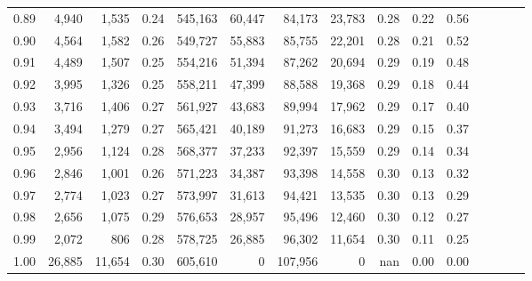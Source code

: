 \begin{tabular}{rrrcrrrrrrrrrrr}
0.89 &   4,940 &   1,535 &                                       0.24 &  545,163 &   60,447 &   84,173 &   23,783 &  0.28 &  0.22 &                         0.56 \\
0.90 &   4,564 &   1,582 &                                       0.26 &  549,727 &   55,883 &   85,755 &   22,201 &  0.28 &  0.21 &                         0.52 \\
0.91 &   4,489 &   1,507 &                                       0.25 &  554,216 &   51,394 &   87,262 &   20,694 &  0.29 &  0.19 &                         0.48 \\
0.92 &   3,995 &   1,326 &                                       0.25 &  558,211 &   47,399 &   88,588 &   19,368 &  0.29 &  0.18 &                         0.44 \\
0.93 &   3,716 &   1,406 &                                       0.27 &  561,927 &   43,683 &   89,994 &   17,962 &  0.29 &  0.17 &                         0.40 \\
0.94 &   3,494 &   1,279 &                                       0.27 &  565,421 &   40,189 &   91,273 &   16,683 &  0.29 &  0.15 &                         0.37 \\
0.95 &   2,956 &   1,124 &                                       0.28 &  568,377 &   37,233 &   92,397 &   15,559 &  0.29 &  0.14 &                         0.34 \\
0.96 &   2,846 &   1,001 &                                       0.26 &  571,223 &   34,387 &   93,398 &   14,558 &  0.30 &  0.13 &                         0.32 \\
0.97 &   2,774 &   1,023 &                                       0.27 &  573,997 &   31,613 &   94,421 &   13,535 &  0.30 &  0.13 &                         0.29 \\
0.98 &   2,656 &   1,075 &                                       0.29 &  576,653 &   28,957 &   95,496 &   12,460 &  0.30 &  0.12 &                         0.27 \\
0.99 &   2,072 &     806 &                                       0.28 &  578,725 &   26,885 &   96,302 &   11,654 &  0.30 &  0.11 &                         0.25 \\
1.00 &  26,885 &  11,654 &                                       0.30 &  605,610 &        0 &  107,956 &        0 &   nan &  0.00 &                         0.00 \\
\bottomrule
\end{tabular}
